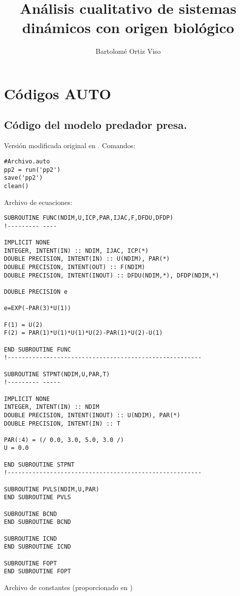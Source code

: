 \documentclass[a4paper,12pt,twoside]{report}
\begin{document}
	


\title{\LARGE {\bf Análisis cualitativo de sistemas dinámicos con origen biológico}\\
 \vspace*{6mm}
}

\author{Bartolomé Ortiz Viso}

\narrowlinespacing
\maketitle

\preface




\body







\appendix
\chapter{Códigos AUTO}\label{aped.A}
\section{Código del modelo predador presa.}
Versión modificada original en \cite{auto}. 
Comandos:
\begin{lstlisting}
#Archivo.auto
pp2 = run('pp2')
save('pp2')
clean()
\end{lstlisting}
Archivo de ecuaciones:
\begin{lstlisting}
SUBROUTINE FUNC(NDIM,U,ICP,PAR,IJAC,F,DFDU,DFDP) 
!--------- ---- 

IMPLICIT NONE
INTEGER, INTENT(IN) :: NDIM, IJAC, ICP(*)
DOUBLE PRECISION, INTENT(IN) :: U(NDIM), PAR(*)
DOUBLE PRECISION, INTENT(OUT) :: F(NDIM)
DOUBLE PRECISION, INTENT(INOUT) :: DFDU(NDIM,*), DFDP(NDIM,*)

DOUBLE PRECISION e

e=EXP(-PAR(3)*U(1)) 

F(1) = U(2)
F(2) = PAR(1)*U(1)*U(1)*U(2)-PAR(1)*U(2)-U(1)

END SUBROUTINE FUNC
!-------------------------------------------------------

SUBROUTINE STPNT(NDIM,U,PAR,T) 
!--------- ----- 

IMPLICIT NONE
INTEGER, INTENT(IN) :: NDIM
DOUBLE PRECISION, INTENT(INOUT) :: U(NDIM), PAR(*)
DOUBLE PRECISION, INTENT(IN) :: T

PAR(:4) = (/ 0.0, 3.0, 5.0, 3.0 /)
U = 0.0

END SUBROUTINE STPNT
!-------------------------------------------------------

SUBROUTINE PVLS(NDIM,U,PAR)
END SUBROUTINE PVLS

SUBROUTINE BCND 
END SUBROUTINE BCND

SUBROUTINE ICND 
END SUBROUTINE ICND

SUBROUTINE FOPT 
END SUBROUTINE FOPT
\end{lstlisting}
Archivo de constantes (proporcionado en \cite{auto})
\end{document}
